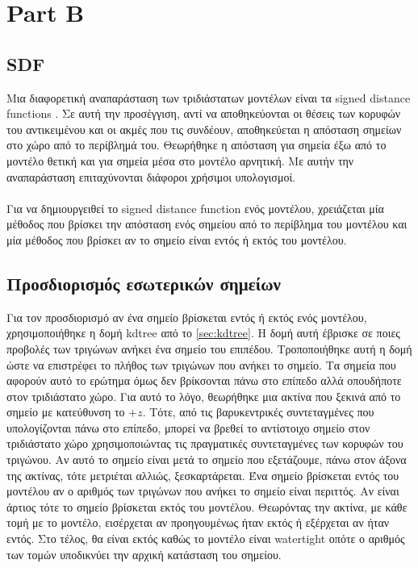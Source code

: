 \documentclass{report}
\begin{document}
\chapter{Part B}


\section{SDF}
Μια διαφορετική αναπαράσταση των τριδιάστατων μοντέλων είναι τα signed distance functions \cite{signed-distance-function}.
Σε αυτή την προσέγγιση, αντί να αποθηκεύονται οι θέσεις των κορυφών του αντικειμένου και οι ακμές που τις συνδέουν, 
αποθηκεύεται η απόσταση σημείων στο χώρο από το περίβλημά του. Θεωρήθηκε η απόσταση για σημεία έξω από το μοντέλο θετική
και για σημεία μέσα στο μοντέλο αρνητική. Με αυτήν την αναπαράσταση επιταχύνονται διάφοροι χρήσιμοι υπολογισμοί.
\\\\
Για να δημιουργειθεί το signed distance function ενός μοντέλου, χρειάζεται μία μέθοδος που βρίσκει την απόσταση
ενός σημείου από το περίβλημα του μοντέλου και μία μέθοδος που βρίσκει αν το σημείο είναι εντός ή εκτός του μοντέλου.


\section{Προσδιορισμός εσωτερικών σημείων}
Για τον προσδιορισμό αν ένα σημείο βρίσκεται εντός ή εκτός ενός μοντέλου, χρησιμοποιήθηκε η δομή kdtree από το \ref{sec:kdtree}.
Η δομή αυτή έβρισκε σε ποιες προβολές των τριγώνων ανήκει ένα σημείο του επιπέδου. Τροποποιήθηκε αυτή η δομή
ώστε να επιστρέφει το πλήθος των τριγώνων που ανήκει το σημείο. Τα σημεία που αφορούν αυτό το ερώτημα όμως δεν βρίκσονται πάνω
στο επίπεδο αλλά οπουδήποτε στον τριδιάστατο χώρο. Για αυτό το λόγο, θεωρήθηκε μια ακτίνα που ξεκινά από το σημείο με
κατεύθυνση το $+z$. Τότε, από τις βαρυκεντρικές συντεταγμένες που υπολογίζονται πάνω στο επίπεδο, μπορεί να βρεθεί το
αντίστοιχο σημείο στον τριδιάστατο χώρο χρησιμοποιώντας τις πραγματικές συντεταγμένες των κορυφών του τριγώνου.
Αν αυτό το σημείο είναι μετά το σημείο που εξετάζουμε, πάνω στον άξονα της ακτίνας, τότε μετριέται αλλιώς, ξεσκαρτάρεται.
Ένα σημείο βρίσκεται εντός του μοντέλου αν ο αριθμός των τριγώνων που ανήκει το σημείο είναι περιττός. Αν είναι άρτιος
τότε το σημείο βρίσκεται εκτός του μοντέλου. Θεωρόντας την ακτίνα, με κάθε τομή με το μοντέλο, εισέρχεται αν προηγουμένως
ήταν εκτός ή εξέρχεται αν ήταν εντός. Στο τέλος, θα είναι εκτός καθώς το μοντέλο είναι watertight οπότε ο αριθμός των τομών
υποδικνύει την αρχική κατάσταση του σημείου.
\end{document}
